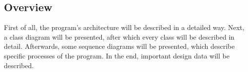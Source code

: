 \subsection{Overview}
First of all, the program's architecture will be described in a detailed way. Next, a class diagram will be presented, after which every class will be described in detail. Afterwards, some sequence diagrams will be presented, which describe specific processes of the program. In the end, important design data will be described.
%

